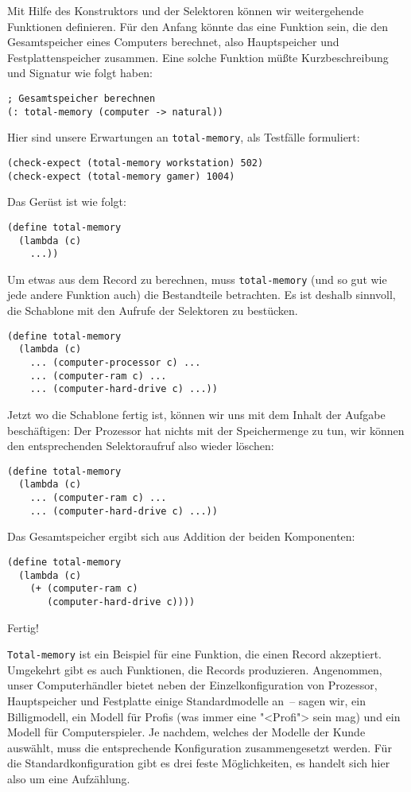 Mit Hilfe des Konstruktors und der Selektoren können wir weitergehende
Funktionen definieren.
Für den Anfang könnte das
eine Funktion sein, die den Gesamtspeicher eines Computers berechnet,
also Hauptspeicher und Festplattenspeicher zusammen.
Eine solche Funktion müßte Kurzbeschreibung und Signatur wie folgt
haben: 
%
\begin{lstlisting}
; Gesamtspeicher berechnen
(: total-memory (computer -> natural))
\end{lstlisting}
%
Hier sind unsere Erwartungen an \lstinline{total-memory}, als Testfälle
formuliert:
%
\begin{lstlisting}
(check-expect (total-memory workstation) 502)
(check-expect (total-memory gamer) 1004)
\end{lstlisting}
% 
Das Gerüst ist wie folgt:
%
\begin{lstlisting}
(define total-memory
  (lambda (c)
    ...))
\end{lstlisting}
%
Um etwas aus dem Record zu berechnen, muss \lstinline{total-memory} (und
so gut wie jede andere Funktion auch) die Bestandteile betrachten.  Es
ist deshalb sinnvoll, die Schablone mit den Aufrufe der Selektoren zu
bestücken.
%
\begin{lstlisting}
(define total-memory
  (lambda (c)
    ... (computer-processor c) ...
    ... (computer-ram c) ...
    ... (computer-hard-drive c) ...))
\end{lstlisting}
%
Jetzt wo die Schablone fertig ist, können wir uns mit dem Inhalt der
Aufgabe beschäftigen: Der Prozessor hat nichts mit der
Speichermenge zu tun, wir können den entsprechenden Selektoraufruf
also wieder löschen:
%
\begin{lstlisting}
(define total-memory
  (lambda (c)
    ... (computer-ram c) ...
    ... (computer-hard-drive c) ...))
\end{lstlisting}
%
Das Gesamtspeicher ergibt sich aus Addition der beiden Komponenten:
%
\begin{lstlisting}
(define total-memory
  (lambda (c)
    (+ (computer-ram c)
       (computer-hard-drive c))))
\end{lstlisting}
%
Fertig!

\lstinline{Total-memory} ist ein Beispiel für eine Funktion, die einen
Record akzeptiert.  Umgekehrt gibt es auch Funktionen, die Records
produzieren.  Angenommen, unser Computerhändler bietet neben der
Einzelkonfiguration von Prozessor, Hauptspeicher und Festplatte einige
Standardmodelle an~-- sagen wir, ein Billigmodell, ein Modell für
Profis (was immer eine "<Profi"> sein mag) und ein Modell für
Computerspieler.  Je nachdem, welches der Modelle der Kunde auswählt,
muss die entsprechende Konfiguration zusammengesetzt werden.  Für die
Standardkonfiguration gibt es drei feste Möglichkeiten, es handelt
sich hier also um eine Aufzählung.

